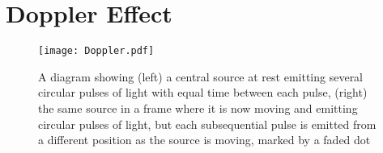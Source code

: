 

\section{Doppler Effect}

\begin{figure}[H]
\centering
\texttt{[image: Doppler.pdf]}
    \caption{A diagram showing (left) a central source at rest emitting several circular pulses of light with equal time between each pulse, (right) the same source in a frame where it is now moving and emitting circular pulses of light, but each subsequential pulse is emitted from a different position as the source is moving, marked by a faded dot}
    \label{fig: doppler effect intro}
\end{figure}

